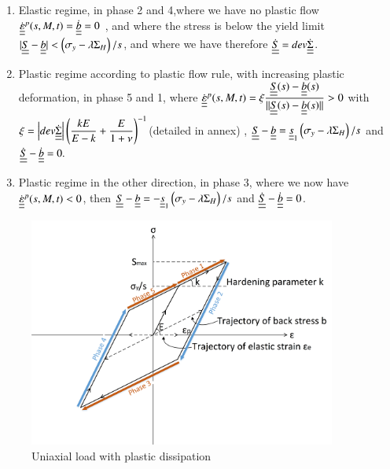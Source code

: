 \documentclass[3p,times,procedia,number]{elsarticle}
\begin{document}
\vspace{6pt}
\begin{enumerate}

\item	Elastic regime, in phase 2 and 4,where we have no plastic flow $\dot{\uline{\uline{\varepsilon}}}^p(s,M,t)=\dot{\uline{\uline{b}}}=0$ ,  and where the stress is below the yield limit $|\uline{\uline{S}}-\uline{\uline{b}}|< \left( \sigma_y-\lambda \Sigma_H\right)/s$, and where we have therefore $\dot{\uline{\uline{S}}}=dev\dot{\uline{\uline{\Sigma}}}$. 
\vspace{6pt}

\item Plastic regime according to plastic flow rule, with increasing plastic deformation, in phase 5 and 1, where	$\dot{\uline{\uline{\varepsilon}}}^p(s,M,t)=\xi\dfrac{\uline{\uline{S}}(s)-\uline{\uline{b}}(s)}{||\uline{\uline{S}}(s)-\uline{\uline{b}}(s)||}> 0$ with  $\xi= \left| dev\dot{\uline{\uline{\Sigma}}}\right| \left(\dfrac{kE}{E-k}+\dfrac{E}{1+\nu} \right) ^{-1}$(detailed in annex) ,  $\uline{\uline{S}}-\uline{\uline{b}}=\uline{\uline{s}}_1 \left(\sigma_y-\lambda \Sigma_H\right)/s$ and $\dot{\uline{\uline{S}}}-\dot{\uline{\uline{b}}}=0.$ 
\vspace{6pt}

\item Plastic regime in the other direction, in phase 3, where we now have	$\dot{\uline{\uline{\varepsilon}}}^p(s,M,t)<0$,  then $\uline{\uline{S}}-\uline{\uline{b}}=-\uline{\uline{s}}_1 \left(\sigma_y-\lambda \Sigma_H\right)/s$ and $\dot{\uline{\uline{S}}}-\dot{\uline{\uline{b}}}=0$.

\end{enumerate}	

\begin{figure}[!h]
\centering
\includegraphics[width=0.9\textwidth]{figures//backstress.png} 
\caption{Uniaxial load with plastic dissipation}
\label{backstress}
\end{figure}
\end{document}
